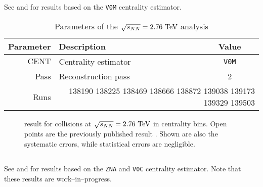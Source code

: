 \subsection{\PbPbCol{}}

See  and  for results
based on the \texttt{V0M} centrality estimator. 

\begin{table}[h!tbp]
  \caption{Parameters of the \PbPbCol{} $\usNN{PbPb}{2760}$ analysis}
  \centering
  \begin{tabular}[t]{|rlc|}
    \hline
    \headColor{} 
    \textbf{Parameter}
    & \textbf{Description}
    & \textbf{Value}\\
    \hline 
    $\text{CENT}$ 
    & Centrality estimator 
    & \texttt{V0M}\\
    \hline 
    \altRowColor{}
    \textsf{Pass} 
    & Reconstruction pass 
    & 2\\
    Runs 
    & \multicolumn{2}{r|}{138190 138225 138469 138666 138872 139038
      139173 139329 139503}\\ 
    \hline
  \end{tabular}
  \label{tab:PbPb:params}
\end{table}


\begin{figure}[h!tbp]
  \centering
  \caption{\ndndeta{} result for \PbPbCol{} collisions at
    $\usNN{PbPb}{2760}$ in centrality bins.  Open points are the
    previously published result \cite{Abbas:2013bpa}. Shown are also
    the systematic errors, while statistical errors are negligible.  }
  \label{fig:PbPb:results}
\end{figure}

\subsection{\pPbCol{}}

See  and  for results
based on the \texttt{ZNA} and \texttt{V0C} centrality estimator.  Note
that these results are work--in--progress. 



